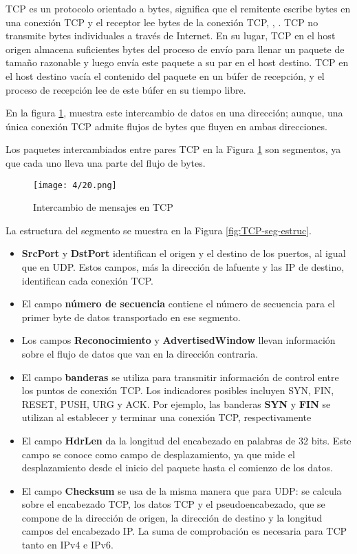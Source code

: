 TCP es un protocolo orientado a bytes, significa que el remitente escribe bytes en una conexión TCP y el receptor lee bytes de la conexión TCP, , . 
TCP no transmite bytes individuales a través de Internet.  En su lugar, TCP en el host origen almacena suficientes bytes del proceso de envío para llenar un paquete de tamaño razonable y luego envía este paquete a su par en el host destino. TCP en el host destino  vacía el contenido del paquete en un búfer de recepción, y el proceso de recepción lee de este búfer en su tiempo libre. 

En la figura \ref{fig:TCP-segmento}, muestra este intercambio de  datos  en una  dirección; aunque,  una única conexión TCP admite flujos de bytes que fluyen en ambas direcciones.

Los paquetes intercambiados entre pares TCP en la Figura \ref{fig:TCP-segmento} son segmentos, ya que cada uno lleva una parte del flujo de bytes.


\begin{figure}
	\texttt{[image: 4/20.png]}
	\caption{Intercambio de mensajes en TCP}
	\label{fig:TCP-segmento}
\end{figure}

 
La estructura del segmento se muestra  en la Figura \ref{fig:TCP-seg-estruc}. 
\begin{itemize}
	\item  \textbf{SrcPort} y \textbf{DstPort} identifican el origen y el destino de los puertos, al igual que en UDP. Estos campos, más la dirección de lafuente y las IP de destino, identifican cada conexión TCP. 
	\item El campo  \textbf{número de secuencia} contiene el número de secuencia para el primer byte de datos 	transportado en ese segmento.
	\item  Los campos \textbf{Reconocimiento} y \textbf{AdvertisedWindow} llevan información sobre el flujo de datos que van en la dirección contraria.
	\item El campo \textbf{banderas}  se utiliza para transmitir información de control entre los puntos de conexión TCP.  Los indicadores posibles incluyen SYN, FIN, RESET, PUSH, URG y
	ACK. Por ejemplo, las banderas \textbf{SYN} y \textbf{FIN} se utilizan al establecer y terminar una conexión TCP, respectivamente
	\item  El campo \textbf{HdrLen} da la longitud del encabezado en palabras de 32 bits. Este campo  se conoce como campo de desplazamiento, ya que mide el desplazamiento desde el inicio del paquete hasta el comienzo de los datos.
	\item El campo \textbf{Checksum} se usa  de la misma manera que para UDP: se calcula sobre el encabezado TCP, los datos TCP y el pseudoencabezado, que se compone de la dirección de origen, la dirección de destino y la longitud 	campos del encabezado IP. La suma de comprobación es necesaria para TCP tanto en IPv4
	e IPv6. 
\end{itemize}

